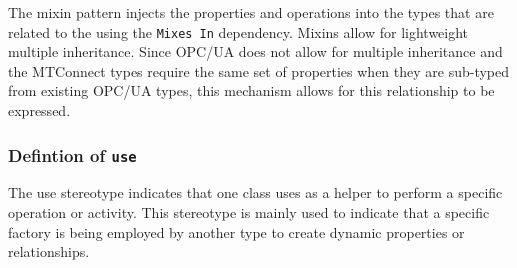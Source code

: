 \FloatBarrier

The mixin pattern injects the properties and operations into the types 
that are related to the using the \texttt{Mixes In} dependency. Mixins allow for
lightweight multiple inheritance. Since OPC/UA does not allow for multiple inheritance 
and the MTConnect  types require the same set of properties when they are sub-typed
from existing OPC/UA types, this mechanism allows for this relationship to be expressed.


\subsubsection{Defintion of \texttt{use}} \label{type:use}

\FloatBarrier

The use stereotype indicates that one class uses as a helper to perform 
a specific operation or activity. This stereotype is mainly used to indicate
that a specific factory is being employed by another type to create dynamic
properties or relationships.

